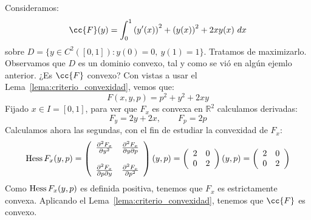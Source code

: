 \begin{ejemplo}
    Consideramos:
    \begin{equation*}
        \cc{F}(y) = \int_{0}^{1} {(y'(x))}^{2}+{(y(x))}^{2}+2xy(x)~dx 
    \end{equation*}
    sobre $D = \{y\in C^2([0,1]) : y(0) = 0,\ y(1) = 1\}$. Tratamos de maximizarlo.\\

    \noindent
    Observamos que $D$ es un dominio convexo, tal y como se vió en algún ejemlo anterior. ¿Es $\cc{F}$ convexo? Con vistas a usar el Lema~\ref{lema:criterio_convexidad}, vemos que:
    \begin{equation*}
        F(x,y,p) = p^2 + y^2 + 2xy 
    \end{equation*}
    Fijado $x\in I = [0,1]$, para ver que $F_x$ es convexa en $\mathbb{R}^2$ calculamos derivadas:
    \begin{equation*}
        F_y = 2y + 2x, \qquad F_p = 2p 
    \end{equation*}
    Calculamos ahora las segundas, con el fin de estudiar la convexidad de $F_x$:
    \begin{equation*}
         \operatorname{Hess} F_x(y,p) = \left(\begin{array}{cc}
            \frac{\partial^2 F_x}{\partial y^2} & \frac{\partial^2 F_x}{\partial y\partial p}  \\
            \\
             \frac{\partial^2 F_x}{\partial p \partial  y}&  \frac{\partial^2 F_x}{\partial p^2}
        \end{array}\right)(y,p) = \left(\begin{array}{cc}
            2 & 0 \\
            0 & 2 
        \end{array}\right)(y,p) = \left(\begin{array}{cc}
            2 & 0 \\
            0 & 2 
        \end{array}\right)
    \end{equation*}
    Como $\operatorname{Hess} F_x(y,p)$ es definida positiva, tenemos que $F_x$ es estrictamente convexa. Aplicando el Lema~\ref{lema:criterio_convexidad}, tenemos que $\cc{F}$ es convexo.\\


\end{ejemplo}
